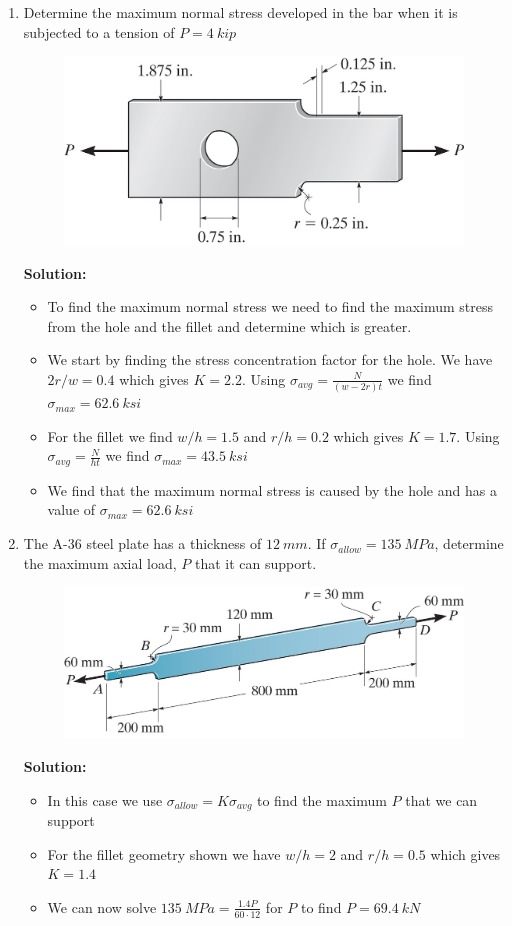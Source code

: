 \documentclass[12pt, oneside]{article}
\let\US\SI
\begin{document}
\begin{enumerate}
	\item %
		Determine the maximum normal stress developed in the bar when it is subjected to a tension of $P = 	\US{4 }{kip} $
		\begin{figure}[H]
			\centering
			\includegraphics[width=0.8\linewidth]{4-92}
		\end{figure}
			\textbf{Solution:}
			\begin{itemize}
				\item To find the maximum normal stress we need to find the maximum stress from the hole and the fillet and determine which is greater.
				\item We start by finding the stress concentration factor for the hole. We have $2r/w = 0.4$ which gives $K = 2.2$. Using $\sigma_{avg} = \frac{N}{(w-2r)t}$ we find $\sigma_{max} = 	\US{62.6}{ksi} $
				\item For the fillet we find $w/h = 1.5$ and $r/h = 0.2$ which gives $K = 1.7$. Using $\sigma_{avg} = \frac{N}{ht}$ we find $\sigma_{max} = 	\US{43.5 }{ksi} $
				\item We find that the maximum normal stress is caused by the hole and has a value of $\sigma_{max} = 	\US{62.6}{ksi} $
			\end{itemize}

	\item %
		The A-36 steel plate has a thickness of $ 	\SI{12 }{mm}  $.
		If $\sigma_{allow} = 	\SI{135 }{MPa} $, determine the maximum axial load, $P$ that it can support.
		\begin{figure}[H]
			\centering
			\includegraphics[width=0.6\linewidth]{4-90}
		\end{figure}
			\textbf{Solution:}
			\begin{itemize}
				\item In this case we use $\sigma_{allow} = K \sigma_{avg}$ to find the maximum $P$ that we can support
				\item For the fillet geometry shown we have $w/h = 2$ and $r/h = 0.5$ which gives $K = 1.4$
				\item We can now solve $ 	\SI{135 }{MPa} = \frac{1.4 P}{60 \cdot 12}  $ for $P$ to find $P = 	\SI{69.4 }{kN} $
			\end{itemize}


\end{enumerate}
\end{document}
